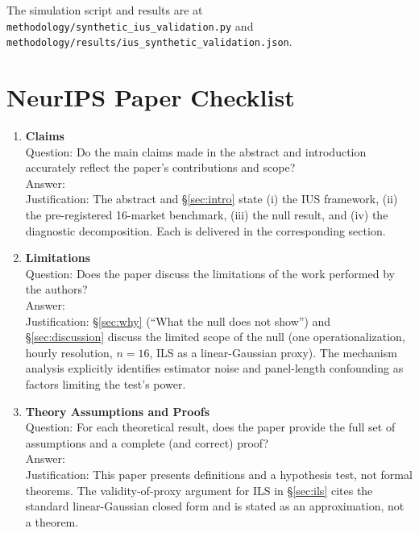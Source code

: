 \documentclass{article}
\begin{document}
The simulation script and results are at \texttt{methodology/synthetic\_ius\_validation.py} and \texttt{methodology/results/ius\_synthetic\_validation.json}.

\section{NeurIPS Paper Checklist}

\begin{enumerate}

\item {\bf Claims}\\
Question: Do the main claims made in the abstract and introduction accurately reflect the paper's contributions and scope?\\
Answer: \answerYes{}\\
Justification: The abstract and \S\ref{sec:intro} state (i) the IUS framework, (ii) the pre-registered 16-market benchmark, (iii) the null result, and (iv) the diagnostic decomposition. Each is delivered in the corresponding section.

\item {\bf Limitations}\\
Question: Does the paper discuss the limitations of the work performed by the authors?\\
Answer: \answerYes{}\\
Justification: \S\ref{sec:why} (``What the null does not show'') and \S\ref{sec:discussion} discuss the limited scope of the null (one operationalization, hourly resolution, $n = 16$, ILS as a linear-Gaussian proxy). The mechanism analysis explicitly identifies estimator noise and panel-length confounding as factors limiting the test's power.

\item {\bf Theory Assumptions and Proofs}\\
Question: For each theoretical result, does the paper provide the full set of assumptions and a complete (and correct) proof?\\
Answer: \answerNA{}\\
Justification: This paper presents definitions and a hypothesis test, not formal theorems. The validity-of-proxy argument for ILS in \S\ref{sec:ils} cites the standard linear-Gaussian closed form and is stated as an approximation, not a theorem.


\end{enumerate}
\end{document}
